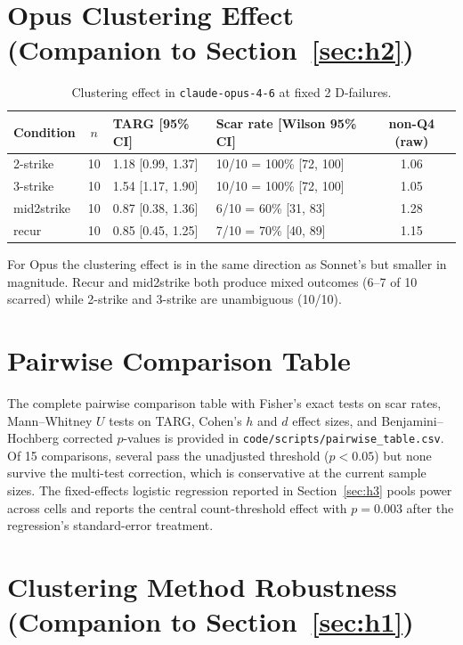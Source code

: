 \documentclass{article}
\begin{document}
\section{Opus Clustering Effect (Companion to Section~\ref{sec:h2})}
\label{sec:appx-clustering-opus}

\begin{table}[h]
\centering
\caption{Clustering effect in \texttt{claude-opus-4-6} at fixed 2 D-failures.}
\small
\begin{tabular}{lcllc}
\toprule
Condition & $n$ & TARG [95\% CI] & Scar rate [Wilson 95\% CI] & non-Q4 (raw) \\
\midrule
2-strike    & 10 & 1.18 [0.99, 1.37] & 10/10 = 100\% [72, 100] & 1.06 \\
3-strike    & 10 & 1.54 [1.17, 1.90] & 10/10 = 100\% [72, 100] & 1.05 \\
mid2strike  & 10 & 0.87 [0.38, 1.36] & 6/10 = 60\% [31, 83] & 1.28 \\
recur       & 10  & 0.85 [0.45, 1.25] & 7/10 = 70\% [40, 89] & 1.15 \\
\bottomrule
\end{tabular}
\end{table}

For Opus the clustering effect is in the same direction as Sonnet's but smaller in magnitude. Recur and mid2strike both produce mixed outcomes (6--7 of 10 scarred) while 2-strike and 3-strike are unambiguous (10/10).

\section{Pairwise Comparison Table}
\label{sec:appx-pairwise}

The complete pairwise comparison table with Fisher's exact tests on scar rates, Mann--Whitney $U$ tests on TARG, Cohen's $h$ and $d$ effect sizes, and Benjamini--Hochberg corrected $p$-values is provided in \texttt{code/scripts/pairwise\_table.csv}. Of 15 comparisons, several pass the unadjusted threshold ($p < 0.05$) but none survive the multi-test correction, which is conservative at the current sample sizes. The fixed-effects logistic regression reported in Section~\ref{sec:h3} pools power across cells and reports the central count-threshold effect with $p = 0.003$ after the regression's standard-error treatment.

\section{Clustering Method Robustness (Companion to Section~\ref{sec:h1})}
\label{sec:appx-cluster-robustness}
\end{document}
